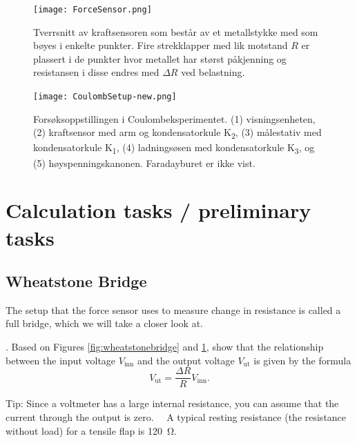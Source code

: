 \documentclass[../Elmag-labhefte-2022.tex]{subfiles}
\begin{document}
\begin{figure}[!htbp]
    \centering
    \texttt{[image: ForceSensor.png]}
    \caption{%
        Tverrsnitt av kraftsensoren som består av et metallstykke med som bøyes i enkelte punkter. Fire strekklapper med lik motstand $R$ er plassert i de punkter hvor metallet har størst påkjenning og resistansen i disse endres med $\Delta R$ ved belastning.
    }
    \label{fig:ForceSensor}
\end{figure}

\begin{figure}[h!t]
    \centering
    \texttt{[image: CoulombSetup-new.png]}
    \vspace{-2mm}
    \caption{%
        Forsøksoppstillingen i Coulombeksperimentet. 
	        (1) visningsenheten, 
	        (2) kraftsensor med arm og kondensatorkule K\textsubscript{2}, 
	        (3) målestativ med kondensatorkule K\textsubscript{1}, 
	        (4) ladningsøsen med kondensatorkule K\textsubscript{3}, og
	        (5) høyspenningskanonen.
        Faradayburet er ikke vist.
     }
   \label{fig:CoulombSetUp_new}
\end{figure}

\clearpage


\section{Calculation tasks / preliminary tasks \label{ch.coulomb.beregn}}
\subsection{Wheatstone Bridge}
The setup that the force sensor uses to measure change in resistance is called a full bridge, which we will take a closer look at.

{. Based on Figures \ref{fig:wheatstonebridge} and \ref{fig:ForceSensor}, show that the relationship between the input voltage $V_\text{inn}$ and the output voltage $V_\text{ut}$ is given by the formula}
\begin{equation}
    \label{eq:fullbridge}
    V_\text{ut} = \frac{\Delta R}  {R} V_\text{inn} .
\end{equation}

Tip: Since a voltmeter has a large internal resistance, you can assume that the current through the output is zero. \ \
A typical resting resistance (the resistance without load) for a tensile flap is \SI{120}{\ohm}.
\end{document}
